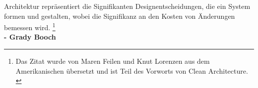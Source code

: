 
\thispagestyle{plain}
\begin{titlepage}

\begin{center}

\large{
    Architektur repräsentiert die Signifikanten Designentscheidungen,
    die ein System formen und gestalten,
    wobei die Signifikanz an den Kosten von Änderungen bemessen wird.
    \footnote[1]{Das Zitat wurde von Maren Feilen und Knut Lorenzen aus
    dem Amerikanischen übersetzt und ist Teil des Vorworts von Clean
    Architecture. \cite[S. 17]{RobertC.Martin2018}}
}\\[2ex]
\small{\textbf{- Grady Booch}}
\end{center}

\end{titlepage}

\restoregeometry
